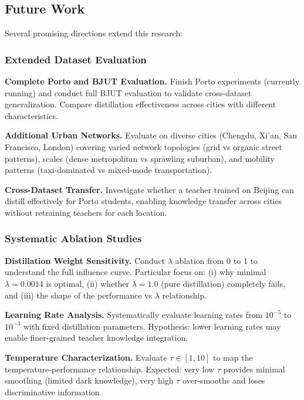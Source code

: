 \subsection{Future Work}
\label{sec:conclusion-future}

Several promising directions extend this research:

\subsubsection{Extended Dataset Evaluation}

\textbf{Complete Porto and BJUT Evaluation.} Finish Porto experiments (currently running) and conduct full BJUT evaluation to validate cross-dataset generalization. Compare distillation effectiveness across cities with different characteristics.

\textbf{Additional Urban Networks.} Evaluate on diverse cities (Chengdu, Xi'an, San Francisco, London) covering varied network topologies (grid vs organic street patterns), scales (dense metropolitan vs sprawling suburban), and mobility patterns (taxi-dominated vs mixed-mode transportation).

\textbf{Cross-Dataset Transfer.} Investigate whether a teacher trained on Beijing can distill effectively for Porto students, enabling knowledge transfer across cities without retraining teachers for each location.

\subsubsection{Systematic Ablation Studies}

\textbf{Distillation Weight Sensitivity.} Conduct $\lambda$ ablation from 0 to 1 to understand the full influence curve. Particular focus on: (i) why minimal $\lambda = 0.0014$ is optimal, (ii) whether $\lambda = 1.0$ (pure distillation) completely fails, and (iii) the shape of the performance vs $\lambda$ relationship.

\textbf{Learning Rate Analysis.} Systematically evaluate learning rates from $10^{-5}$ to $10^{-3}$ with fixed distillation parameters. Hypothesis: lower learning rates may enable finer-grained teacher knowledge integration.

\textbf{Temperature Characterization.} Evaluate $\tau \in [1, 10]$ to map the temperature-performance relationship. Expected: very low $\tau$ provides minimal smoothing (limited dark knowledge), very high $\tau$ over-smooths and loses discriminative information.

